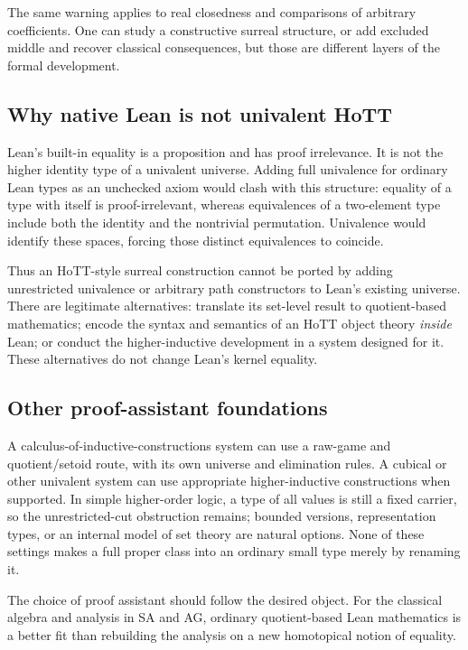 \documentclass[11pt,letterpaper]{article}
\theoremstyle{definition}
\theoremstyle{remark}
\numberwithin{equation}{section}
\begin{document}
The same warning applies to real closedness and comparisons of arbitrary coefficients. One can study a constructive surreal structure, or add excluded middle and recover classical consequences, but those are different layers of the formal development.

\subsection{Why native Lean is not univalent HoTT}
Lean's built-in equality is a proposition and has proof irrelevance. It is not the higher identity type of a univalent universe. Adding full univalence for ordinary Lean types as an unchecked axiom would clash with this structure: equality of a type with itself is proof-irrelevant, whereas equivalences of a two-element type include both the identity and the nontrivial permutation. Univalence would identify these spaces, forcing those distinct equivalences to coincide.

Thus an HoTT-style surreal construction cannot be ported by adding unrestricted univalence or arbitrary path constructors to Lean's existing universe. There are legitimate alternatives: translate its set-level result to quotient-based mathematics; encode the syntax and semantics of an HoTT object theory \emph{inside} Lean; or conduct the higher-inductive development in a system designed for it. These alternatives do not change Lean's kernel equality.

\subsection{Other proof-assistant foundations}
A calculus-of-inductive-constructions system can use a raw-game and quotient/setoid route, with its own universe and elimination rules. A cubical or other univalent system can use appropriate higher-inductive constructions when supported. In simple higher-order logic, a type of all values is still a fixed carrier, so the unrestricted-cut obstruction remains; bounded versions, representation types, or an internal model of set theory are natural options. None of these settings makes a full proper class into an ordinary small type merely by renaming it.

The choice of proof assistant should follow the desired object. For the classical algebra and analysis in SA and AG, ordinary quotient-based Lean mathematics is a better fit than rebuilding the analysis on a new homotopical notion of equality.
\end{document}
